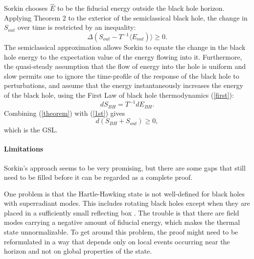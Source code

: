 \documentclass{article}
\begin{document}
Sorkin chooses $\hat{E}$ to be the fiducial energy outside the black hole horizon.  Applying Theorem 2 to the exterior of the semiclassical black hole, the change in $S_{out}$ over time is restricted by an inequality:
\begin{equation}\label{theorem}
\Delta(S_{out} - T^{-1}\langle E_{out})\rangle \ge 0.
\end{equation}
The semiclassical approximation allows Sorkin to equate the change in the black hole energy to the expectation value of the energy flowing into it.  Furthermore, the quasi-steady assumption that the flow of energy into the hole is uniform and slow permits one to ignore the time-profile of the response of the black hole to perturbations, and assume that the energy instantaneously increases the energy of the black hole, using the First Law of black hole thermodynamics (\ref{first}):
\begin{equation}\label{1st}
dS_{BH} = T^{-1}dE_{BH}.
\end{equation}
Combining (\ref{theorem}) with (\ref{1st}) gives
\begin{equation}
d(S_{BH} + S_{out}) \ge 0,
\end{equation}
which is the GSL.
\paragraph{Limitations}
Sorkin's approach seems to be very promising, but there are some gaps that still need to be filled before it can be regarded as a complete proof.

One problem is that the Hartle-Hawking state is not well-defined for black holes with superradiant modes.  This includes rotating black holes except when they are placed in a sufficiently small reflecting box \cite{DO08}.  The trouble is that there are field modes carrying a negative amount of fiducial energy, which makes the thermal state unnormalizable.  To get around this problem, the proof might need to be reformulated in a way that depends only on local events occurring near the horizon and not on global properties of the state.
\end{document}
